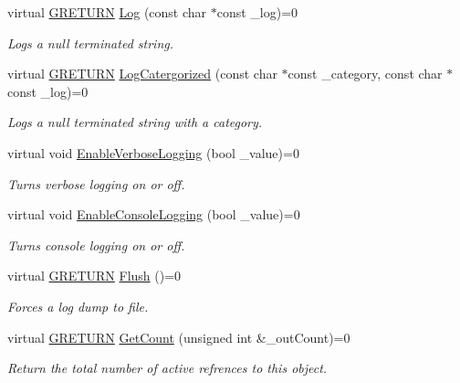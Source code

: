 \begin{DoxyCompactItemize}
\item 
virtual \hyperlink{namespace_g_w_a69b1aaebac1cac8049825f035884c95b}{G\+R\+E\+T\+U\+RN} \hyperlink{class_g_w_1_1_c_o_r_e_1_1_g_log_a9b9ec52b1b35eb2fd9a63ec7312fd31a}{Log} (const char $\ast$const \+\_\+log)=0
\begin{DoxyCompactList}\small\item\em Logs a null terminated string. \end{DoxyCompactList}\item 
virtual \hyperlink{namespace_g_w_a69b1aaebac1cac8049825f035884c95b}{G\+R\+E\+T\+U\+RN} \hyperlink{class_g_w_1_1_c_o_r_e_1_1_g_log_ab7dbe43179c1de11c9ddac9d6cba01cf}{Log\+Catergorized} (const char $\ast$const \+\_\+category, const char $\ast$const \+\_\+log)=0
\begin{DoxyCompactList}\small\item\em Logs a null terminated string with a category. \end{DoxyCompactList}\item 
virtual void \hyperlink{class_g_w_1_1_c_o_r_e_1_1_g_log_ac14e65291dba9480deadd772a8f0e307}{Enable\+Verbose\+Logging} (bool \+\_\+value)=0
\begin{DoxyCompactList}\small\item\em Turns verbose logging on or off. \end{DoxyCompactList}\item 
virtual void \hyperlink{class_g_w_1_1_c_o_r_e_1_1_g_log_a9a486a646a0a02bb5724100c1849fcec}{Enable\+Console\+Logging} (bool \+\_\+value)=0
\begin{DoxyCompactList}\small\item\em Turns console logging on or off. \end{DoxyCompactList}\item 
virtual \hyperlink{namespace_g_w_a69b1aaebac1cac8049825f035884c95b}{G\+R\+E\+T\+U\+RN} \hyperlink{class_g_w_1_1_c_o_r_e_1_1_g_log_a1e0bb42d95ddd42fa019d5cd6050ff97}{Flush} ()=0
\begin{DoxyCompactList}\small\item\em Forces a log dump to file. \end{DoxyCompactList}\item 
virtual \hyperlink{namespace_g_w_a69b1aaebac1cac8049825f035884c95b}{G\+R\+E\+T\+U\+RN} \hyperlink{class_g_w_1_1_c_o_r_e_1_1_g_interface_a80f212dcdf60202cf9da49405863d1d5}{Get\+Count} (unsigned int \&\+\_\+out\+Count)=0
\begin{DoxyCompactList}\small\item\em Return the total number of active refrences to this object. \end{DoxyCompactList}\item 

\end{DoxyCompactItemize}
